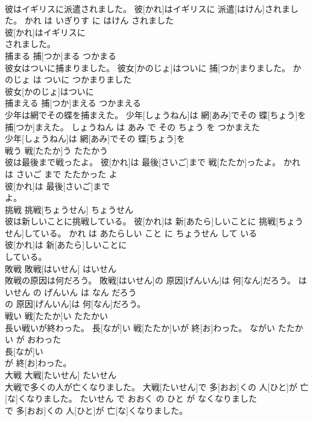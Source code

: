 \documentclass[8pt]{extreport}
\begin{document}
\begin{CJK}{UTF8}{min}
\\	彼はイギリスに派遣されました。	彼[かれ]はイギリスに 派遣[はけん]されました。	かれ は いぎりす に はけん されました	
\\	彼[かれ]はイギリスに
\\	されました。			
\\	捕まる	捕[つか]まる	つかまる	
\\	彼女はついに捕まりました。	彼女[かのじょ]はついに 捕[つか]まりました。	かのじょ は ついに つかまりました	
\\	彼女[かのじょ]はついに
\\	捕まえる	捕[つか]まえる	つかまえる	
\\	少年は網でその蝶を捕まえた。	少年[しょうねん]は 網[あみ]でその 蝶[ちょう]を 捕[つか]まえた。	しょうねん は あみ で その ちょう を つかまえた	
\\	少年[しょうねん]は 網[あみ]でその 蝶[ちょう]を
\\	戦う	戦[たたか]う	たたかう	
\\	彼は最後まで戦ったよ。	彼[かれ]は 最後[さいご]まで 戦[たたか]ったよ。	かれ は さいご まで たたかった よ	
\\	彼[かれ]は 最後[さいご]まで
\\	よ。			
\\	挑戦	挑戦[ちょうせん]	ちょうせん	
\\	彼は新しいことに挑戦している。	彼[かれ]は 新[あたら]しいことに 挑戦[ちょうせん]している。	かれ は あたらしい こと に ちょうせん して いる	
\\	彼[かれ]は 新[あたら]しいことに
\\	している。			
\\	敗戦	敗戦[はいせん]	はいせん	
\\	敗戦の原因は何だろう。	敗戦[はいせん]の 原因[げんいん]は 何[なん]だろう。	はいせん の げんいん は なん だろう	
\\	の 原因[げんいん]は 何[なん]だろう。			
\\	戦い	戦[たたか]い	たたかい	
\\	長い戦いが終わった。	長[なが]い 戦[たたか]いが 終[お]わった。	ながい たたかい が おわった	
\\	長[なが]い
\\	が 終[お]わった。			
\\	大戦	大戦[たいせん]	たいせん	
\\	大戦で多くの人が亡くなりました。	大戦[たいせん]で 多[おお]くの 人[ひと]が 亡[な]くなりました。	たいせん で おおく の ひと が なくなりました	
\\	で 多[おお]くの 人[ひと]が 亡[な]くなりました。			

\end{CJK}
\end{document}
